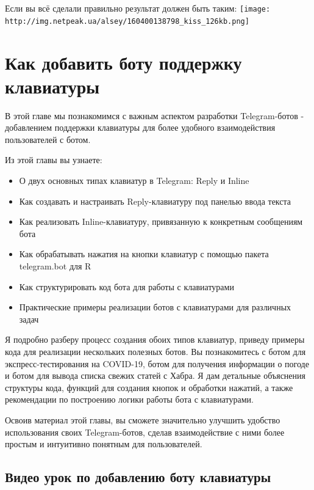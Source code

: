 \documentclass[
]{book}
\providecommand{\tightlist}{%
  \setlength{\itemsep}{0pt}\setlength{\parskip}{0pt}}
\begin{document}
Если вы всё сделали правильно результат должен быть таким:
\texttt{[image: http://img.netpeak.ua/alsey/160400138798\_kiss\_126kb.png]}

\chapter{Как добавить боту поддержку клавиатуры}\label{ux43aux430ux43a-ux434ux43eux431ux430ux432ux438ux442ux44c-ux431ux43eux442ux443-ux43fux43eux434ux434ux435ux440ux436ux43aux443-ux43aux43bux430ux432ux438ux430ux442ux443ux440ux44b}

В этой главе мы познакомимся с важным аспектом разработки Telegram-ботов - добавлением поддержки клавиатуры для более удобного взаимодействия пользователей с ботом.

Из этой главы вы узнаете:

\begin{itemize}
\tightlist
\item
  О двух основных типах клавиатур в Telegram: Reply и Inline
\item
  Как создавать и настраивать Reply-клавиатуру под панелью ввода текста
\item
  Как реализовать Inline-клавиатуру, привязанную к конкретным сообщениям бота
\item
  Как обрабатывать нажатия на кнопки клавиатур с помощью пакета telegram.bot для R
\item
  Как структурировать код бота для работы с клавиатурами
\item
  Практические примеры реализации ботов с клавиатурами для различных задач
\end{itemize}

Я подробно разберу процесс создания обоих типов клавиатур, приведу примеры кода для реализации нескольких полезных ботов. Вы познакомитесь с ботом для экспресс-тестирования на COVID-19, ботом для получения информации о погоде и ботом для вывода списка свежих статей с Хабра.
Я дам детальные объяснения структуры кода, функций для создания кнопок и обработки нажатий, а также рекомендации по построению логики работы бота с клавиатурами.

Освоив материал этой главы, вы сможете значительно улучшить удобство использования своих Telegram-ботов, сделав взаимодействие с ними более простым и интуитивно понятным для пользователей.

\section{Видео урок по добавлению боту клавиатуры}\label{ux432ux438ux434ux435ux43e-ux443ux440ux43eux43a-ux43fux43e-ux434ux43eux431ux430ux432ux43bux435ux43dux438ux44e-ux431ux43eux442ux443-ux43aux43bux430ux432ux438ux430ux442ux443ux440ux44b}
\end{document}
